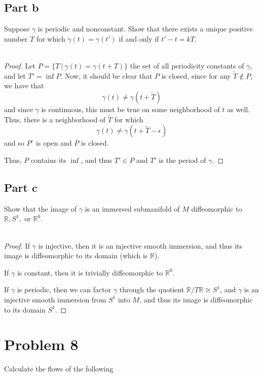 \documentclass[fontsize=11pt]{scrartcl} %
\numberwithin{equation}{section} %
\numberwithin{figure}{section} %
\numberwithin{table}{section} %
\newcommand{\R}{\mathbb{R}}
\begin{document}
\subsection*{Part b}
Suppose $\gamma$ is periodic and nonconstant. Show that there exists a unique
positive number $T$ for which $\gamma(t)=\gamma(t')$ if and only if $t'-t=kT$.
\\
\\
\begin{proof}
    Let $P = \{T\ |\ \gamma(t) = \gamma(t+T)\}$ the set of all periodicity
    constants of $\gamma$, and let $T' = \inf P$. Now, it should be clear that
    $P$ is closed, since for any $\tilde{T}\not\in P$, we have that 
    \[
        \gamma(t) \neq \gamma(t+\tilde{T})
    \]
    and since $\gamma$ is continuous, this must  be true on some neighborhood of
    $t$ as well. Thus, there is a neighborhood of $\tilde{T}$ for which
    \[
        \gamma(t)\neq\gamma(t+\tilde{T}-\epsilon)
    \]
    and so $P^c$ is open and $P$ is closed.

    Thus, $P$ contains its $\inf$, and thus $T'\in P$ and $T'$ is the period of
    $\gamma$.
\end{proof}

\subsection*{Part c}
Show that the image of $\gamma$ is an immersed submanifold of $M$ diffeomorphic
to $\R, S^1,$ or $\R^0$.
\\
\\
\begin{proof}
    If $\gamma$ is injective, then it is an injective smooth immersion, and thus
    its image is diffeomorphic to its domain (which is $\R$).

    If $\gamma$ is constant, then it is trivially diffeomorphic to $\R^0$.

    If $\gamma$ is periodic, then we can factor $\gamma$ through the quotient
    $\R/{T\R}\cong S^1$, and $\gamma$ is an injective smooth immersion from
    $S^1$ into $M$, and thus its image is diffeomorphic to its domain $S^1$.
\end{proof}

\section*{Problem 8} %
Calculate the flows of the following
\end{document}
